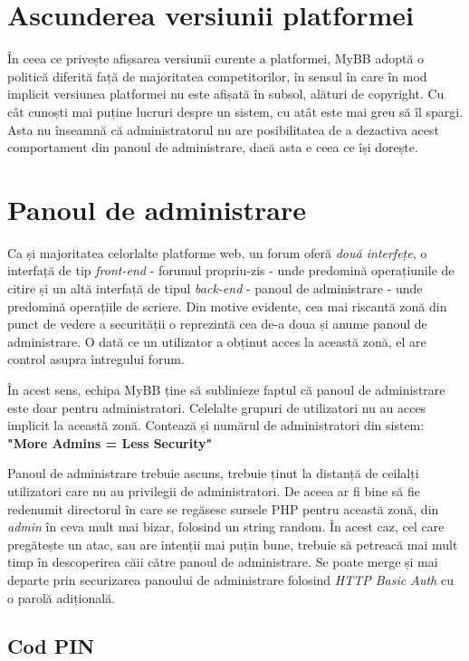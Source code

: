 \section{Ascunderea versiunii platformei}

În ceea ce privește afișsarea versiunii curente a platformei, MyBB adoptă o politică diferită față de majoritatea competitorilor, în sensul în care în mod implicit versiunea platformei nu este afișată în subsol, alături de copyright. Cu cât cunoști mai puține lucruri despre un sistem, cu atât este mai greu să îl spargi. Asta nu înseamnă că administratorul nu are posibilitatea de a dezactiva acest comportament din panoul de administrare, dacă asta e ceea ce își dorește.

\section{Panoul de administrare}

Ca și majoritatea celorlalte platforme web, un forum oferă \textit{două interfețe}, o interfață de tip \textit{front-end} - forumul propriu-zis - unde predomină operațiunile de citire și un altă interfață de tipul \textit{back-end} - panoul de administrare - unde predomină operațiile de scriere. Din motive evidente, cea mai riscantă zonă din punct de vedere a securității o reprezintă cea de-a doua și anume panoul de administrare. O dată ce un utilizator a obținut acces la această zonă, el are control asupra întregului forum.

În acest sens, echipa MyBB ține să sublinieze faptul că panoul de administrare este doar pentru administratori. Celelalte grupuri de utilizatori nu au acces implicit la această zonă. Contează și numărul de administratori din sistem: \textbf{"More Admins = Less Security"}

Panoul de administrare trebuie ascuns, trebuie ținut la distanță de ceilalți utilizatori care nu au privilegii de administratori. De aceea ar fi bine să fie redenumit directorul în care se regăsesc sursele PHP pentru această zonă, din \textit{admin} în ceva mult mai bizar, folosind un string random. În acest caz, cel care pregătește un atac, sau are intenții mai puțin bune, trebuie să petreacă mai mult timp în descoperirea căii către panoul de administrare. Se poate merge și mai departe prin securizarea panoului de administrare folosind \textit{HTTP Basic Auth} cu o parolă adițională.

\subsection{Cod PIN}

